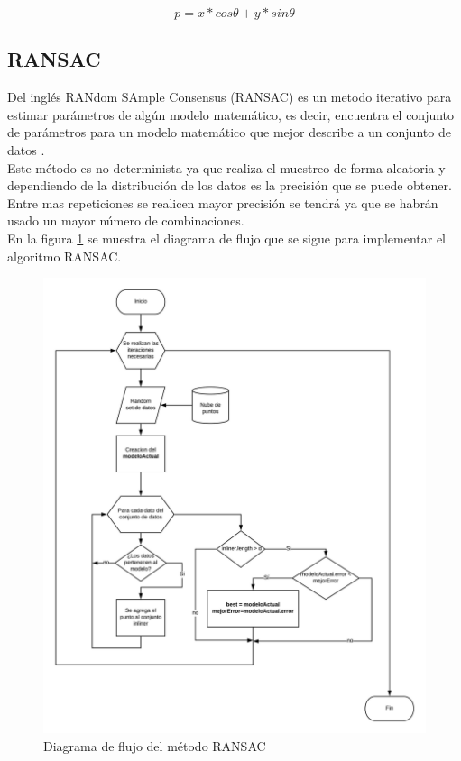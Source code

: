         	    \begin{equation}
        	    \label{eq:polarLine}
        	    p=x*cos\theta +y*sin\theta
        	    \end{equation}  
        
    \subsection{RANSAC}
    
        Del inglés RANdom SAmple Consensus (RANSAC) es un \gls{metodo} iterativo para estimar parámetros de algún modelo matemático, es decir, encuentra el conjunto de parámetros para un modelo matemático que mejor describe a un conjunto de datos \cite{Fischler1981}. \\
        
        Este método es no determinista ya que realiza el muestreo de forma aleatoria y dependiendo de la distribución de los datos es la precisión que se puede obtener. Entre mas repeticiones se realicen mayor precisión se tendrá ya que se habrán usado un mayor número de combinaciones.\\
    
        En la figura \ref{fig:RANSAC} se muestra el diagrama de flujo que se sigue para implementar el \gls{algoritmo} RANSAC.\\
        
        \begin{figure}[!htb]
            \centering
            \includegraphics[width=1\textwidth]{01Introduccion/imagenes/RANSAC.jpeg}
            \caption{Diagrama de flujo del método RANSAC}
            \label{fig:RANSAC}
        \end{figure}
        
